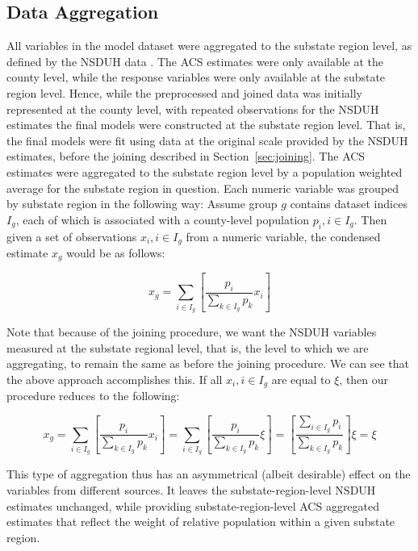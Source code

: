 \documentclass{article}
\begin{document}
\subsection{Data Aggregation}\label{sec:aggregation}

All variables in the model dataset were aggregated to the substate region level,
as defined by the NSDUH data \cite{samhsa_substate_region_defs}.
The ACS estimates were only available at the county level,
while the response variables were only available at the substate region level.
Hence, while the preprocessed and joined data was
initially represented at the county level,
with repeated observations for the NSDUH estimates
the final models were constructed at the substate region level.
That is, the final models were fit using data at the original
scale provided by the NSDUH estimates, before the joining described in
Section~\ref{sec:joining}.
The ACS estimates were aggregated to the substate region level
by a population weighted average for the substate region in question.
Each numeric variable was grouped by substate region
in the following way:
Assume group $g$ contains dataset indices $I_g$,
each of which is associated with a county-level population
$p_{i}, i \in I_g$.
Then given a set of observations $x_{i}, i \in I_g$
from a numeric variable,
the condensed estimate $x_g$ would be as follows:

\begin{equation*}
    x_g = \sum_{i \in I_g}
    \left[ \frac{p_{i}}{\sum_{k \in I_g} p_{k}} x_i \right]
\end{equation*}

Note that because of the joining procedure,
we want the NSDUH variables measured at the substate regional level,
that is, the level to which we are aggregating,
to remain the same as before the joining procedure.
We can see that the above approach accomplishes this.
If all $x_i, i \in I_g$ are equal to $\xi$,
then our procedure reduces to the following:

\begin{equation*}
    x_g =
    \sum_{i \in I_g}
    \left[ \frac{p_{i}}{\sum_{k \in I_g} p_{k}} x_i \right] =
    \sum_{i \in I_g}
    \left[ \frac{p_{i}}{\sum_{k \in I_g} p_{k}} \xi \right] =
    \left[ \frac{\sum_{i \in I_g}p_{i}}{\sum_{k \in I_g} p_{k}} \right] \xi =
    \xi
\end{equation*}

This type of aggregation thus has an asymmetrical (albeit desirable)
effect on the variables from different sources.
It leaves the substate-region-level NSDUH estimates unchanged,
while providing substate-region-level ACS aggregated estimates
that reflect the weight of relative population within a given substate region.
\end{document}
